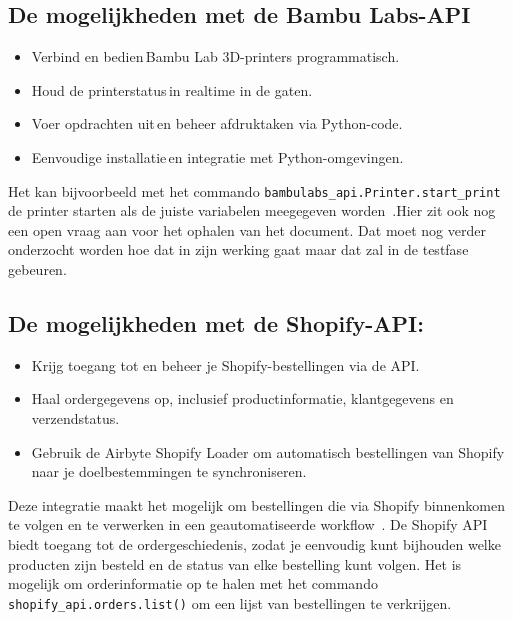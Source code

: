 \newpage

\subsection{De mogelijkheden met de Bambu Labs-API}

\begin{itemize}
    \item Verbind en bedien Bambu Lab 3D-printers programmatisch. 
    \item Houd de printerstatus in realtime in de gaten. 
    \item Voer opdrachten uit en beheer afdruktaken via Python-code. 
    \item Eenvoudige installatie en integratie met Python\--omgevingen. 
\end{itemize}

Het kan bijvoorbeeld met het commando \texttt{bambulabs\_api.Printer.start\_print} de printer s\-tarten als  de juiste variabelen meegegeven worden~\autocite{bambulabsAPI}.Hier zit ook nog een open vraag aan voor het ophalen van het document. Dat moet nog verder onderzocht worden hoe dat in zijn werking gaat maar dat zal in de testfase gebeuren.  

\subsection{De mogelijkheden met de Shopify-API:}

\begin{itemize} 
    \item Krijg toegang tot en beheer je Shopify-bestellingen via de API. 
    \item Haal ordergegevens op, inclusief productinformatie, klantgegevens en verzendstatus. 
    \item Gebruik de Airbyte Shopify Loader om automatisch bestellingen van Shopify naar je doelbestemmingen te synchroniseren. 
\end{itemize}

Deze integratie maakt het mogelijk om bestellingen die via Shopify binnenkomen te volgen en te verwerken in een geautomatiseerde workflow~\autocite{ilamaIndexShopify}. De Shopify API biedt toegang tot de ordergeschiedenis, zodat je eenvoudig kunt bijhouden welke producten zijn besteld en de status van elke bestelling kunt volgen. Het is mogelijk om orderinformatie op te halen met het commando \texttt{shopify\_api.orders.list()} om een lijst van bestellingen te verkrijgen.

